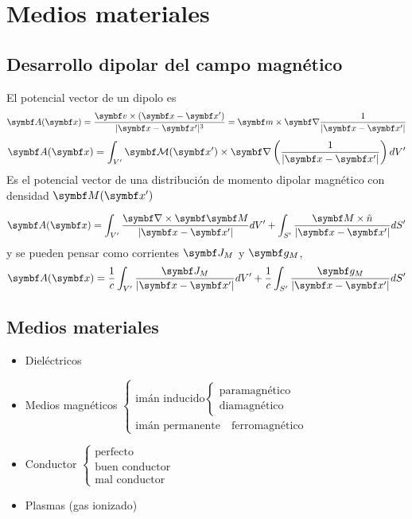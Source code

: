 \documentclass[10pt,oneside]{CBFT_book}
\begin{document}
\chapter{Medios materiales}

\section{Desarrollo dipolar del campo magnético}

El potencial vector de un dipolo es
\[
	\vb{A}(\vb{x}) = \frac{\vb{v}\times(\vb{x}-\vb{x}')}{|\vb{x}-\vb{x}'|^3} = \vb{m} \times \Nabla 
		\frac{1}{|\vb{x}-\vb{x}'|}
\]
\[
	\vb{A}(\vb{x}) = \int_{V'} \vb{\mathcal{M}}(\vb{x}') \times \Nabla 
			\left(\frac{1}{|\vb{x}-\vb{x}'|}\right) dV'
\]
Es el potencial vector de una distribución de momento dipolar magnético con densidad $ \vb{M}(\vb{x}')$

\[
	\vb{A}(\vb{x}) = \int_{V'} \frac{\rotorm{\vb{M}}}{|\vb{x}-\vb{x}'|} dV' +
			\int_{S'} \frac{\vb{M}\times\hat{n}}{|\vb{x}-\vb{x}'|} dS'
\]
y se pueden pensar como corrientes $\vb{J}_M$ y $\vb{g}_M$,
\[
	\vb{A}(\vb{x}) = \frac{1}{c} \int_{V'} \frac{\vb{J}_M}{|\vb{x}-\vb{x}'|} dV' +
			\frac{1}{c} \int_{S'} \frac{\vb{g}_M}{|\vb{x}-\vb{x}'|} dS'
\]

\section{Medios materiales}

\begin{itemize}
 \item Dieléctricos
 \item Medios magnéticos
	$\begin{cases}
	 \text{imán inducido}
		\begin{cases}
		\text{paramagnético} \\
		\text{diamagnético}
		\end{cases} \\
	 \text{imán permanente} \quad \text{ferromagnético}
	\end{cases}$
 \item Conductor
	$\begin{cases}
	 \text{perfecto} \\
	 \text{buen conductor} \\
	 \text{mal conductor}
	\end{cases}$
\item Plasmas (gas ionizado)
\end{itemize}
\end{document}
